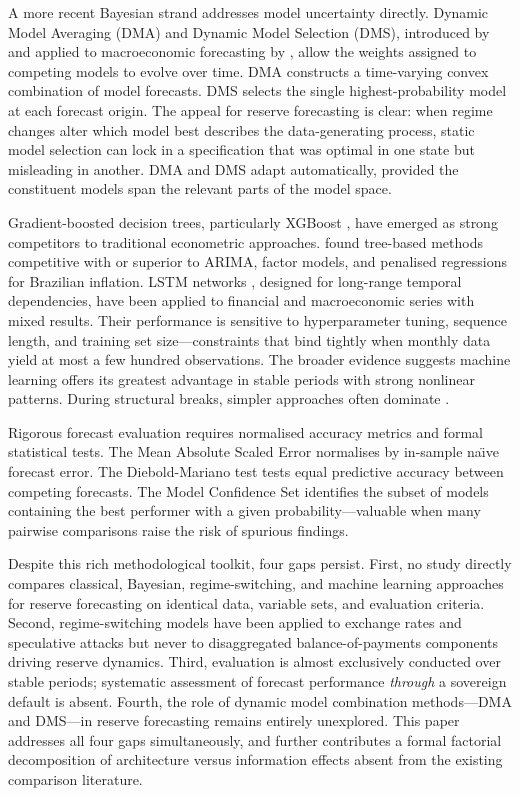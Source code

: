 \documentclass[12pt,a4paper]{article}
\begin{document}
A more recent Bayesian strand addresses model uncertainty directly. Dynamic Model Averaging (DMA) and Dynamic Model Selection (DMS), introduced by \cite{Raftery2010} and applied to macroeconomic forecasting by \cite{KoopKorobilis2012}, allow the weights assigned to competing models to evolve over time. DMA constructs a time-varying convex combination of model forecasts. DMS selects the single highest-probability model at each forecast origin. The appeal for reserve forecasting is clear: when regime changes alter which model best describes the data-generating process, static model selection can lock in a specification that was optimal in one state but misleading in another. DMA and DMS adapt automatically, provided the constituent models span the relevant parts of the model space.

Gradient-boosted decision trees, particularly XGBoost \citep{ChenGuestrin2016}, have emerged as strong competitors to traditional econometric approaches. \cite{MedeirosVasconcelosVeigaZilberman2021} found tree-based methods competitive with or superior to ARIMA, factor models, and penalised regressions for Brazilian inflation. LSTM networks \citep{HochreiterSchmidhuber1997}, designed for long-range temporal dependencies, have been applied to financial and macroeconomic series with mixed results. Their performance is sensitive to hyperparameter tuning, sequence length, and training set size---constraints that bind tightly when monthly data yield at most a few hundred observations. The broader evidence suggests machine learning offers its greatest advantage in stable periods with strong nonlinear patterns. During structural breaks, simpler approaches often dominate \citep{RichardsonMulderVehbi2021}.

Rigorous forecast evaluation requires normalised accuracy metrics and formal statistical tests. The Mean Absolute Scaled Error \citep{HyndmanKoehler2006} normalises by in-sample na\"{\i}ve forecast error. The Diebold-Mariano test \citep{DieboldMariano1995} tests equal predictive accuracy between competing forecasts. The Model Confidence Set \citep{HansenLundeNason2011} identifies the subset of models containing the best performer with a given probability---valuable when many pairwise comparisons raise the risk of spurious findings.

Despite this rich methodological toolkit, four gaps persist. First, no study directly compares classical, Bayesian, regime-switching, and machine learning approaches for reserve forecasting on identical data, variable sets, and evaluation criteria. Second, regime-switching models have been applied to exchange rates and speculative attacks but never to disaggregated balance-of-payments components driving reserve dynamics. Third, evaluation is almost exclusively conducted over stable periods; systematic assessment of forecast performance \textit{through} a sovereign default is absent. Fourth, the role of dynamic model combination methods---DMA and DMS---in reserve forecasting remains entirely unexplored. This paper addresses all four gaps simultaneously, and further contributes a formal factorial decomposition of architecture versus information effects absent from the existing comparison literature.
\end{document}
